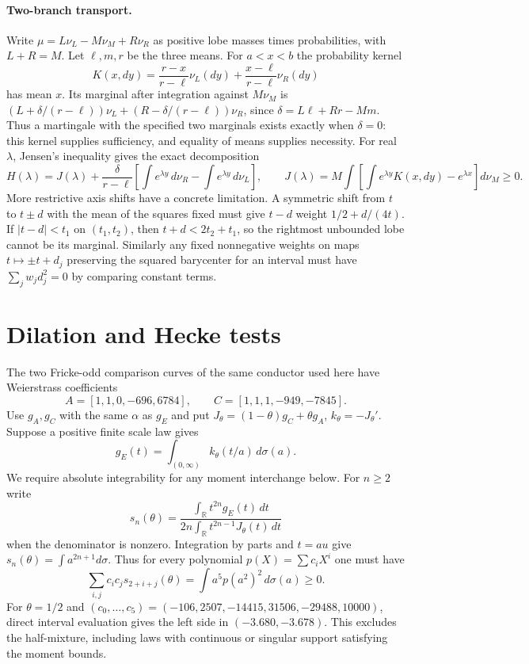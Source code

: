 \documentclass[11pt]{article}
\begin{document}
\paragraph{Two-branch transport.}
Write $\mu=L\nu_L-M\nu_M+R\nu_R$ as positive lobe masses times
probabilities, with $L+R=M$. Let $\ell,m,r$ be the three means.
For $a<x<b$ the probability kernel
\[
 K(x,dy)=\frac{r-x}{r-\ell}\nu_L(dy)
          +\frac{x-\ell}{r-\ell}\nu_R(dy)
\]
has mean $x$. Its marginal after integration against $M\nu_M$
is $(L+\delta/(r-\ell))\nu_L+(R-\delta/(r-\ell))\nu_R$,
since $\delta=L\ell+Rr-Mm$. Thus a martingale with the specified
two marginals exists exactly when $\delta=0$: this kernel supplies
sufficiency, and equality of means supplies necessity. For real
$\lambda$, Jensen's inequality gives the exact decomposition
\[
 H(\lambda)=J(\lambda)+\frac{\delta}{r-\ell}
   \left[\int e^{\lambda y}\,d\nu_R-\int e^{\lambda y}\,d\nu_L\right],
 \qquad J(\lambda)=M\int\!\left[\int e^{\lambda y}K(x,dy)-e^{\lambda x}\right]d\nu_M\ge0 .
\]
More restrictive axis shifts have a concrete limitation. A symmetric
shift from $t$ to $t\pm d$ with the mean of the squares fixed must give
$t-d$ weight $1/2+d/(4t)$. If $|t-d|<t_1$ on $(t_1,t_2)$, then
$t+d<2t_2+t_1$, so the rightmost unbounded lobe cannot be its marginal.
Similarly any fixed nonnegative weights on maps $t\mapsto\pm t+d_j$
preserving the squared barycenter for an interval must have
$\sum_j w_jd_j^2=0$ by comparing constant terms.

\section{Dilation and Hecke tests}

The two Fricke-odd comparison curves of the same conductor used here have
Weierstrass coefficients
\[
 A=[1,1,0,-696,6784],\qquad C=[1,1,1,-949,-7845].
\]
Use $g_A,g_C$ with the same $\alpha$ as $g_E$ and put
$J_\theta=(1-\theta)g_C+\theta g_A$, $k_\theta=-J_\theta'$.
Suppose a positive finite scale law gives
\[
 g_E(t)=\int_{(0,\infty)} k_\theta(t/a)\,d\sigma(a).
\]
We require absolute integrability for any moment interchange below.
For $n\ge2$ write
\[
 s_n(\theta)=
 \frac{\int_{\mathbb R} t^{2n}g_E(t)\,dt}
 {2n\int_{\mathbb R}t^{2n-1}J_\theta(t)\,dt}
\]
when the denominator is nonzero. Integration by parts and $t=au$ give
$s_n(\theta)=\int a^{2n+1}d\sigma$. Thus for every polynomial $p(X)=\sum c_i X^i$
one must have
\[
 \sum_{i,j}c_ic_j s_{2+i+j}(\theta)
  =\int a^5p(a^2)^2\,d\sigma(a)\ge0 .
\]
For $\theta=1/2$ and $(c_0,\ldots,c_5)=(-106,2507,-14415,31506,-29488,10000)$,
direct interval evaluation gives the left side in $(-3.680,-3.678)$.
This excludes the half-mixture, including laws with continuous or singular
support satisfying the moment bounds.
\end{document}
